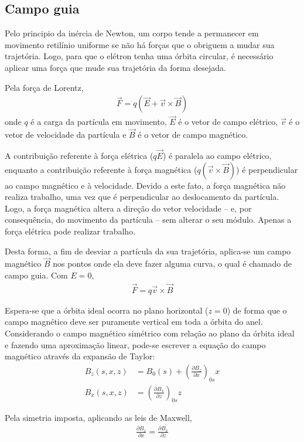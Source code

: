\subsection{Campo guia}\label{sec:2.2}
Pelo principio da inércia de Newton, um corpo tende a permanecer em movimento retilínio uniforme se não há forças que o obriguem a mudar sua trajetória. Logo, para que o elétron tenha uma órbita circular, é necessário aplicar uma força que mude sua trajetória da forma desejada.

Pela força de Lorentz,
\begin{align}
	\vec{F} = q\left(\vec{E} + \vec{v} \times \vec{B}\right)
\end{align}
onde $q$ é a carga da partícula em movimento, $\vec{E}$ é o vetor de campo elétrico, $\vec{v}$ é o vetor de velocidade da partícula e $\vec{B}$ é o vetor de campo magnético.

A contribuição referente à força elétrica ($q\vec{E}$) é paralela ao campo elétrico, enquanto a contribuição referente à força magnética ($q(\vec{v}\times\vec{B})$) é perpendicular ao campo magnético e à velocidade. Devido a este fato, a força magnética não realiza trabalho, uma vez que é perpendicular ao deslocamento da partícula. Logo, a força magnética altera a direção do vetor velocidade -- e, por consequência, do movimento da partícula -- sem alterar o seu módulo. Apenas a força elétrica pode realizar trabalho.

Desta forma, a fim de desviar a partícula da sua trajetória, aplica-se um campo magnético $\vec{B}$ nos pontos onde ela deve fazer alguma curva, o qual é chamado de campo guia. Com $E=0$,
\begin{align}
	\vec{F} = q\vec{v}\times\vec{B}
\end{align}

Espera-se que a órbita ideal ocorra no plano horizontal ($z=0$) de forma que o campo magnético deve ser puramente vertical em toda a órbita do anel. Considerando o campo magnético simétrico com relação ao plano da órbita ideal e fazendo uma aproximação linear, pode-se escrever a equação do campo magnético através da expansão de Taylor:
\begin{align}
	B_z(s,x,z) &= B_0(s) + \left(\frac{\partial B_z}{\partial x}\right)_{0s} x\label{eq:2.01}\\
	B_x(s,x,z) &= \left(\frac{\partial B_x}{\partial z}\right)_{0s} z\label{eq:2.02}
\end{align}

Pela simetria imposta, aplicando as leis de Maxwell,
\begin{align}
	\frac{\partial B_z}{\partial x} = \frac{\partial B_x}{\partial z}
\end{align}

